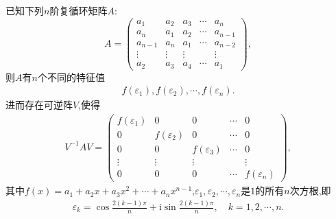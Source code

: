 \documentclass[../../main.tex]{subfiles}%
\begin{document}
\begin{proposition}[循环矩阵的特征值和对角化]\label{proposition:循环矩阵的特征值和对角化}
已知下列$n$阶复循环矩阵\(A\):
\[
A = 
\begin{pmatrix}
a_1 & a_2 & a_3 & \cdots & a_n\\
a_n & a_1 & a_2 & \cdots & a_{n - 1}\\
a_{n - 1} & a_n & a_1 & \cdots & a_{n - 2}\\
\vdots & \vdots & \vdots & & \vdots\\
a_2 & a_3 & a_4 & \cdots & a_1
\end{pmatrix},
\]
则\(A\)有$n$个不同的特征值
\begin{align*}
f(\varepsilon_1),f(\varepsilon_2),\cdots ,f(\varepsilon_n).
\end{align*}
进而存在可逆阵$V$,使得
\begin{align*}
V^{-1}AV = \begin{pmatrix}
f(\varepsilon_1) & 0 & 0 & \cdots & 0\\
0 & f(\varepsilon_2) & 0 & \cdots & 0\\
0 & 0 & f(\varepsilon_3) & \cdots & 0\\
\vdots & \vdots & \vdots & & \vdots\\
0 & 0 & 0 & \cdots & f(\varepsilon_n)
\end{pmatrix},
\end{align*}
其中\(f(x)=a_1 + a_2x + a_3x^2+\cdots+a_nx^{n - 1}\),\(\varepsilon_1,\varepsilon_2,\cdots,\varepsilon_n\)是\(1\)的所有\(n\)次方根,即
\begin{align*}
\varepsilon_k = \cos \frac{2(k-1)\pi}{n} + \mathrm{i} \sin \frac{2(k-1)\pi}{n}, \quad k=1,2,\cdots,n.
\end{align*}
\end{proposition}
\end{document}
